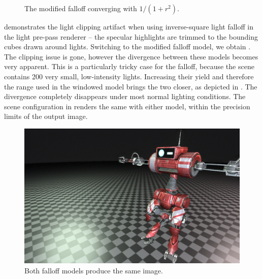 \begin{figure}[ht!]
  \centering
  \caption[Modified falloff, better case]{The modified falloff converging with $1 / (1 + r^2)$.}
\label{fig:lppFalloffBetterCase}
\end{figure}

 demonstrates the light clipping artifact when using inverse-square light falloff in the light pre-pass renderer -- the specular highlights are trimmed to the bounding cubes drawn around lights. Switching to the modified falloff model, we obtain . The clipping issue is gone, however the divergence between these models becomes very apparent. This is a particularly tricky case for the falloff, because the scene contains 200 very small, low-intensity lights. Increasing their yield and therefore the range used in the windowed model brings the two closer, as depicted in . The divergence completely disappears under most normal lighting conditions. The scene configuration in  renders the same with either model, within the precision limits of the output image.

\begin{figure}[ht!]
  \centering
    \includegraphics[width=0.45\linewidth]{./Figures/lightPrePass/falloffSame.jpg}
    \caption[Falloffs converged]{Both falloff models produce the same image.}
  \label{fig:lppFalloffConverged}
\end{figure}

